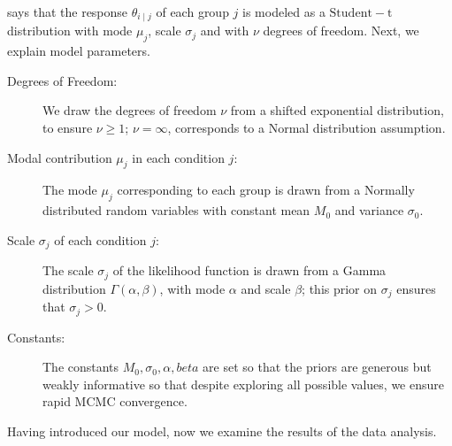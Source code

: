  says that the response $\theta_{i \mid j}$ of each group $j$ is modeled as a $\mathrm{Student-t}$ distribution with mode $\mu_j$,  scale $\sigma_j$ and with $\nu$ degrees of freedom. Next, we explain model parameters.


\begin{description}
    \item[Degrees of Freedom:] We draw the degrees of freedom $\nu$ from a shifted exponential distribution, to ensure $\nu \geq 1$; $\nu=\infty$, corresponds to a Normal distribution assumption.
    \item[Modal contribution $\mu_j$ in each condition $j$:] The mode $\mu_j$ corresponding to each group is drawn from a Normally distributed random variables with constant mean $M_0$ and variance $\sigma_0$. 
    \item[Scale $\sigma_j$ of each condition $j$:]  The scale $\sigma_j$ of the likelihood function is drawn from a Gamma distribution $\Gamma(\alpha, \beta)$, with mode $\alpha$ and scale $\beta$; this prior on $\sigma_j$ ensures that $\sigma_j > 0$. 
    \item[Constants:] The constants $M_0, \sigma_0, \alpha, beta$ are set so that the priors are generous but weakly informative so that despite exploring all possible values, we ensure rapid MCMC convergence.
\end{description}


Having introduced our model, now we examine the results of the data analysis.




